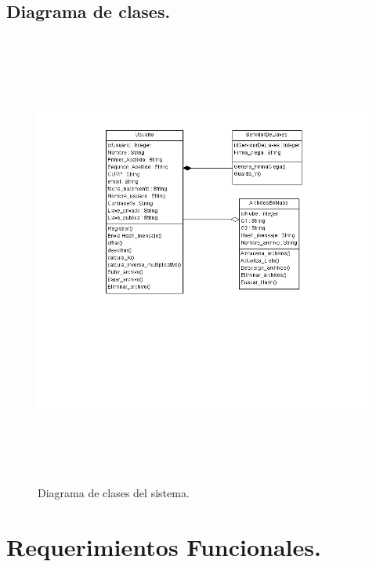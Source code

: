 \newpage

\subsection{Diagrama de clases. }

\begin{figure}[H]
\centering
\includegraphics[width=18cm, height=15cm]{./images/DiagramaClasesTT.png}
\caption{Diagrama de clases del sistema.}

\end{figure} 
\newpage
\section{Requerimientos Funcionales. }

